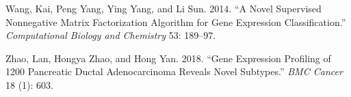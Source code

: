 \documentclass[
]{article}
\newlength{\cslhangindent}
\newenvironment{CSLReferences}[2] %
 {\begin{list}{}{%
  \setlength{\itemindent}{0pt}
  \setlength{\leftmargin}{0pt}
  \setlength{\parsep}{0pt}
  \ifodd #1
   \setlength{\leftmargin}{\cslhangindent}
   \setlength{\itemindent}{-1\cslhangindent}
  \fi
  \setlength{\itemsep}{#2\baselineskip}}}
 {\end{list}}
\begin{document}
\begin{CSLReferences}{1}{0}
Wang, Kai, Peng Yang, Ying Yang, and Li Sun. 2014. {``A Novel Supervised
Nonnegative Matrix Factorization Algorithm for Gene Expression
Classification.''} \emph{Computational Biology and Chemistry} 53:
189--97.

Zhao, Lan, Hongya Zhao, and Hong Yan. 2018. {``Gene Expression Profiling
of 1200 Pancreatic Ductal Adenocarcinoma Reveals Novel Subtypes.''}
\emph{BMC Cancer} 18 (1): 603.

\end{CSLReferences}
\end{document}
